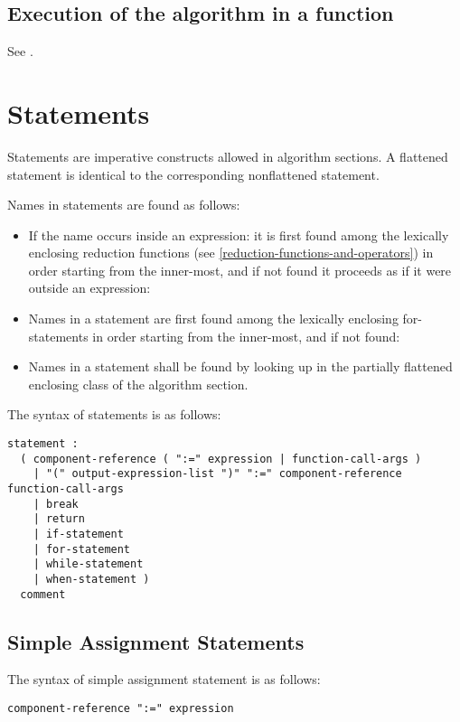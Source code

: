\subsection{Execution of the algorithm in a function}\label{execution-of-the-algorithm-in-a-function}

See .

\section{Statements}\label{statements}

Statements are imperative constructs allowed in algorithm sections. A
flattened statement is identical to the corresponding nonflattened
statement.

Names in statements are found as follows:
\begin{itemize}
\item
  If the name occurs inside an expression: it is first found among the
  lexically enclosing reduction functions (see \cref{reduction-functions-and-operators}) in order
  starting from the inner-most, and if not found it proceeds as if it
  were outside an expression:
\item
  Names in a statement are first found among the lexically enclosing
  for-statements in order starting from the inner-most, and if not
  found:
\item
  Names in a statement shall be found by looking up in the partially
  flattened enclosing class of the algorithm section.
\end{itemize}

The syntax of statements is as follows:
\begin{lstlisting}[language=grammar]
statement :
  ( component-reference ( ":=" expression | function-call-args )
    | "(" output-expression-list ")" ":=" component-reference function-call-args
    | break
    | return
    | if-statement
    | for-statement
    | while-statement
    | when-statement )
  comment
\end{lstlisting}

\subsection{Simple Assignment Statements}\label{simple-assignment-statements}

The syntax of simple assignment statement is as follows:
\begin{lstlisting}[language=grammar]
component-reference ":=" expression
\end{lstlisting}

